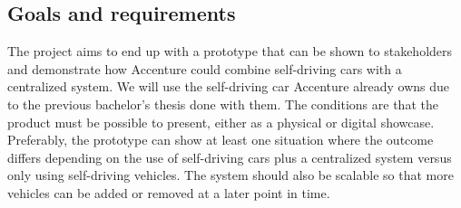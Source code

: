 \subsection{Goals and requirements}
The project aims to end up with a prototype that can be shown to stakeholders and demonstrate how Accenture could combine self-driving cars with a centralized system. We will use the self-driving car Accenture already owns due to the previous bachelor's thesis done with them. The conditions are that the product must be possible to present, either as a physical or digital showcase. Preferably, the prototype can show at least one situation where the outcome differs depending on the use of self-driving cars plus a centralized system versus only using self-driving vehicles. The system should also be scalable so that more vehicles can be added or removed at a later point in time.

